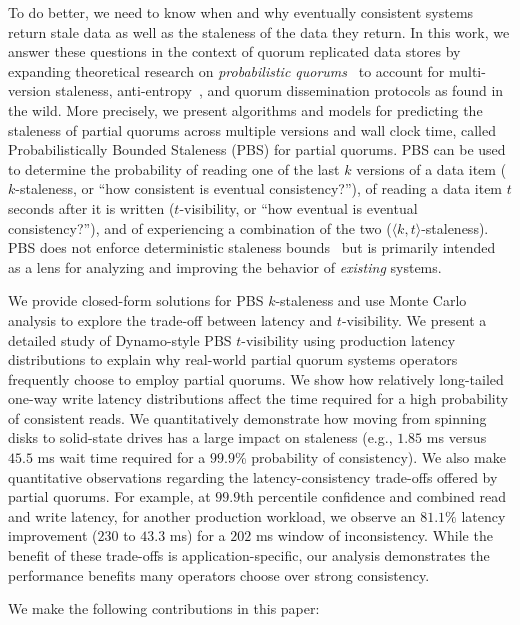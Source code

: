 \documentclass{vldb}
\begin{document}
To do better, we need to know when and why eventually consistent
systems return stale data as well as the staleness of the data they
return.  In this work, we answer these questions in the context of
quorum replicated data stores by expanding theoretical research on
\textit{probabilistic quorums}~\cite{prob-quorum, quorum-overview} to
account for multi-version staleness, anti-entropy~\cite{antientropy}, and quorum
dissemination protocols as found in the wild.  More precisely, we
present algorithms and models for predicting the staleness
of partial quorums across multiple versions and wall clock time,
called Probabilistically Bounded Staleness (PBS) for partial
quorums. PBS can be used to determine the probability of reading one
of the last $k$ versions of a data item ($k$-staleness, or ``how
consistent is eventual consistency?''), of reading a data item $t$
seconds after it is written ($t$-visibility, or ``how eventual is
eventual consistency?''), and of experiencing a combination of the two
($\langle k, t \rangle$-staleness). PBS does not enforce deterministic
staleness bounds~\cite{ aqua, trapp,vahdat-article, vahdat-bounded,
  frac} but is primarily intended as a lens for analyzing and
improving the behavior of \textit{existing} systems.

We provide closed-form solutions for PBS $k$-staleness and use Monte
Carlo analysis to explore the trade-off between latency and
$t$-visibility.  We present a detailed study of Dynamo-style PBS
$t$-visibility using production latency distributions to explain why
real-world partial quorum systems operators frequently choose to
employ partial quorums. We show how relatively long-tailed one-way
write latency distributions affect the time required for a high
probability of consistent reads.  We quantitatively demonstrate how
moving from spinning disks to solid-state drives has a large impact on
staleness (e.g., $1.85$ ms versus $45.5$ ms wait time required for a
$99.9$\% probability of consistency).  We also make quantitative
observations regarding the latency-consistency trade-offs offered by
partial quorums.  For example, at $99.9$th percentile confidence and
combined read and write latency, for another production workload, we
observe an $81.1\%$ latency improvement ($230$ to $43.3$ ms) for a
$202$ ms window of inconsistency.  While the benefit of these
trade-offs is application-specific, our analysis demonstrates the
performance benefits many operators choose over strong consistency.

We make the following contributions in this paper:
\end{document}

